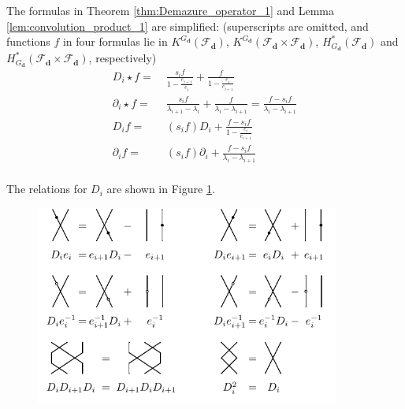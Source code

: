 \documentclass[reqno,11pt]{book}
\numberwithin{equation}{section}
\theoremstyle{plain}
\theoremstyle{plain}
\numberwithin{equation}{section}
\theoremstyle{remark}
\newcommand{\dimvec}[1]{\mathbf{#1}}
\begin{document}
The formulas in Theorem \ref{thm:Demazure_operator_1} and Lemma \ref{lem:convolution_product_1} are simplified: (superscripts are omitted, and functions $f$ in four formulas lie in $K^{G_{\dimvec{d}}} (\mathcal{F}_{\dimvec{d}})$, $K^{G_{\dimvec{d}}} (\mathcal{F}_{\dimvec{d}} \times  \mathcal{F}_{\dimvec{d}})$, $H_{G_{\dimvec{d}}}^{*}(\mathcal{F}_{\dimvec{d}})$ and $H_{G_{\dimvec{d}}}^{*}(\mathcal{F}_{\dimvec{d}} \times  \mathcal{F}_{\dimvec{d}})$, respectively)
\begin{equation*}
\begin{aligned}
  D_i \star f =\;& \frac{s_i f}{1- \frac{e_{i+1}}{e_i}} + \frac{f}{1- \frac{e_{i}}{e_{i+1}}}\\ 
  \partial_i \star f =\;& \frac{s_i f}{\lambda_{i+1}-\lambda_{i}}+\frac{ f}{\lambda_{i}-\lambda_{i+1}}=\frac{f -s_i f}{\lambda_{i}-\lambda_{i+1}}\\
  D_i f =\;& (s_i f) D_i + \frac{f- s_i f}{1- \frac{e_{i}}{e_{i+1}}}\\ 
  \partial_i f =\;& (s_i f) \partial_i + \frac{f- s_i f}{\lambda_{i}-\lambda_{i+1}}\\   
\end{aligned}
\end{equation*}

The relations for $D_i$ are shown in Figure \ref{fig:relations_1}.
\begin{figure}[ht]
  \vspace{0cm}
    \centering 
    \includegraphics[width=10cm]{figures/strands/relations_1.pdf} 
    \caption{}
      \label{fig:relations_1}        
\end{figure}
\end{document}
